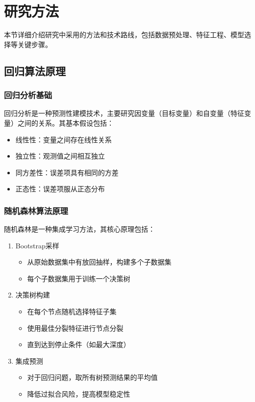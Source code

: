 \section{研究方法}

本节详细介绍研究中采用的方法和技术路线，包括数据预处理、特征工程、模型选择等关键步骤\cite{hastie2009elements}。

\subsection{回归算法原理}
\subsubsection{回归分析基础}
回归分析是一种预测性建模技术，主要研究因变量（目标变量）和自变量（特征变量）之间的关系\cite{li2021comparative}。其基本假设包括：
\begin{itemize}
    \item 线性性：变量之间存在线性关系
    \item 独立性：观测值之间相互独立
    \item 同方差性：误差项具有相同的方差
    \item 正态性：误差项服从正态分布
\end{itemize}

\subsubsection{随机森林算法原理}
随机森林是一种集成学习方法，其核心原理包括：
\begin{enumerate}
    \item Bootstrap采样
    \begin{itemize}
        \item 从原始数据集中有放回抽样，构建多个子数据集
        \item 每个子数据集用于训练一个决策树
    \end{itemize}
    
    \item 决策树构建
    \begin{itemize}
        \item 在每个节点随机选择特征子集
        \item 使用最佳分裂特征进行节点分裂
        \item 直到达到停止条件（如最大深度）
    \end{itemize}
    
    \item 集成预测
    \begin{itemize}
        \item 对于回归问题，取所有树预测结果的平均值
        \item 降低过拟合风险，提高模型稳定性
    \end{itemize}
\end{enumerate}

